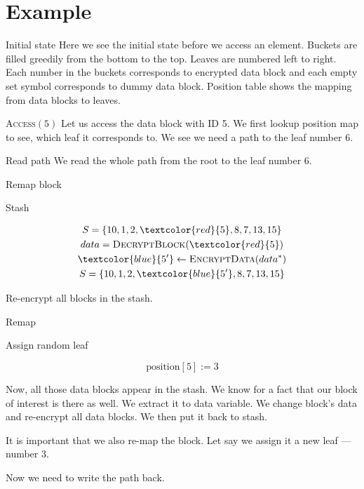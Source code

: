 


\section{Example}

	\exampleFrame%
		{Initial state}
		{}
		{}
		{}
		{
			Here we see the initial state before we access an element.
			Buckets are filled greedily from the bottom to the top.
			Leaves are numbered left to right.
			Each number in the buckets corresponds to encrypted data block and each empty set symbol corresponds to dummy data block.
			Position table shows the mapping from data blocks to leaves.
		}

	\exampleFrame%
		{\textsc{Access}$(5)$}
		{\selectedtrue}
		{}
		{}
		{
			Let us access the data block with ID 5.
			We first lookup position map to see, which leaf it corresponds to.
			We see we need a path to the leaf number 6.
		}
	
	\exampleFrame%
		{Read path}
		{
			\selectedtrue%
			\pathreadtrue%
		}
		{}
		{}
		{
			We read the whole path from the root to the leaf number 6.
		}

	\exampleFrame%
		{Remap block}
		{}
		{
			\begin{block}{Stash}
				
				\begin{gather*}
					S = \{ 10, 1, 2, \textcolor{red}{5}, 8, 7, 13, 15 \} \\
					data = \textsc{DecryptBlock}(\textcolor{red}{5}) \\
					\textcolor{blue}{5^\prime} \gets \textsc{EncryptData}(data^{*}) \\
					S = \{ 10, 1, 2, \textcolor{blue}{5^\prime}, 8, 7, 13, 15 \}
				\end{gather*}

				Re-encrypt all blocks in the stash.
	
			\end{block}
		}
		{
			\vspace{10pt}
			\begin{block}{Remap}
				
				Assign random leaf
	
				\[
					\text{position}[5] := 3
				\]
	
			\end{block}
		}
		{
			Now, all those data blocks appear in the stash.
			We know for a fact that our block of interest is there as well.
			We extract it to data variable.
			We change block's data and re-encrypt all data blocks.
			We then put it back to stash.

			It is important that we also re-map the block.
			Let say we assign it a new leaf --- number 3.

			Now we need to write the path back.
		}

